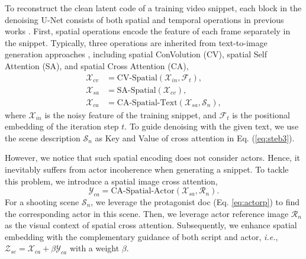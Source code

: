 To reconstruct the clean latent code of a training video snippet,
each block in the denoising U-Net consists of both spatial and temporal operations in previous works \cite{Wang2023LAVIEHV}.
First,
spatial operations encode the feature of each frame separately in the snippet.
Typically,
three operations are inherited from text-to-image generation approaches \cite{saharia2022imagen, Ramesh2022HierarchicalTI, rombach2022highResolution, Balaji2022eDiffITD, Nichol2021GLIDETP},
including 
spatial ConVolution (CV), 
spatial Self Attention (SA),
and 
spatial Cross Attention (CA),
\begin{align}
\mathcal{X}_{cv}&=\text{CV-Spatial}(\mathcal{X}_{in}, \mathcal{F}_{t}),
\label{eq:steb1}\\    
\mathcal{X}_{sa}&=\text{SA-Spatial}(\mathcal{X}_{cv}),
\label{eq:steb2}\\
\mathcal{X}_{ca}&=\text{CA-Spatial-Text}(\mathcal{X}_{sa},\mathcal{S}_{n}),
\label{eq:steb3} 
\end{align}
where
$\mathcal{X}_{in}$ is the noisy feature of the training snippet,
and $\mathcal{F}_{t}$ is the positional embedding of the iteration step $t$.
To guide denoising with the given text, 
we use the scene description $\mathcal{S}_{n}$ as Key and Value of cross attention in Eq. (\ref{eq:steb3}).

However,
we notice that 
such spatial encoding does not consider actors.
Hence,
it inevitably suffers from actor incoherence when generating a snippet.
To tackle this problem,
we introduce a spatial image cross attention,
\begin{equation}
\mathcal{Y}_{ca}=\text{CA-Spatial-Actor}(\mathcal{X}_{sa},\mathcal{R}_{n}).
\label{eq:steb4} 
\end{equation}
For a shooting scene $\mathcal{S}_{n}$,
we leverage the protagonist doc (Eq. \ref{eq:actorp}) to find the corresponding actor in this scene.
Then,
we leverage actor reference image $\mathcal{R}_{n}$ as the visual context of spatial cross attention.
Subsequently,
we enhance spatial embedding with the complementary guidance of both script and actor,
\textit{i.e.},
$\mathcal{Z}_{se}=\mathcal{X}_{ca}+\beta\mathcal{Y}_{ca}$ with a weight $\beta$.

